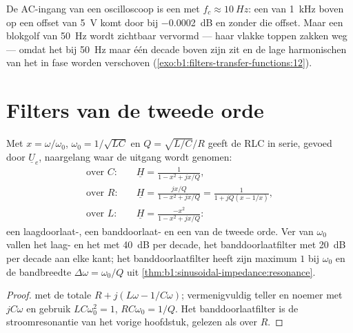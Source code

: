 \begin{example}[AC-koppeling]\label{ex:b1:filters-transfer-functions:accoupling}
De AC-ingang van een oscilloscoop is een  met $f_c \approx \qty{10}{Hz}$:
een  van \qty{1}{kHz} boven op een offset van \qty{5}{V} komt door bij
\qty{-0.0002}{dB} en zonder die offset. Maar een blokgolf van \qty{50}{Hz}
wordt zichtbaar vervormd --- haar vlakke toppen zakken weg --- omdat het 
bij \qty{50}{Hz} maar één decade boven zijn  zit en de lage
harmonischen van het  in fase worden verschoven
(\cref{exo:b1:filters-transfer-functions:12}).
\end{example}

\section{Filters van de tweede orde}

\begin{proposition}\label{prop:b1:filters-transfer-functions:rlc}
Met $x = \omega/\omega_0$, $\omega_0 = 1/\sqrt{LC}$ en $Q =
\sqrt{L/C}/R$ geeft de RLC in serie, gevoed door $\underline U_e$, naargelang
waar de uitgang wordt genomen:
\begin{align*}
\text{over } C:&\quad \underline H = \frac{1}{1 - x^2 + jx/Q}, \\
\text{over } R:&\quad \underline H = \frac{jx/Q}{1 - x^2 + jx/Q} = \frac{1}{1 + jQ(x - 1/x)}, \\
\text{over } L:&\quad \underline H = \frac{-x^2}{1 - x^2 + jx/Q}:
\end{align*}
een laagdoorlaat-, een banddoorlaat- en een  van de tweede orde. Ver van
$\omega_0$ vallen het laag- en het  met \qty{40}{dB} per decade,
het banddoorlaatfilter met \qty{20}{dB} per decade aan elke kant; het banddoorlaatfilter
heeft zijn maximum $1$ bij $\omega_0$ en de bandbreedte $\Delta\omega =
\omega_0/Q$ uit \cref{thm:b1:sinusoidal-impedance:resonance}.
\end{proposition}

\begin{proof}
 met de totale  $R + j(L\omega - 1/C\omega)$;
vermenigvuldig teller en noemer met $jC\omega$ en gebruik
$LC\omega_0^2 = 1$, $RC\omega_0 = 1/Q$. Het banddoorlaatfilter is de
stroomresonantie van het vorige hoofdstuk, gelezen als  over $R$.
\end{proof}

